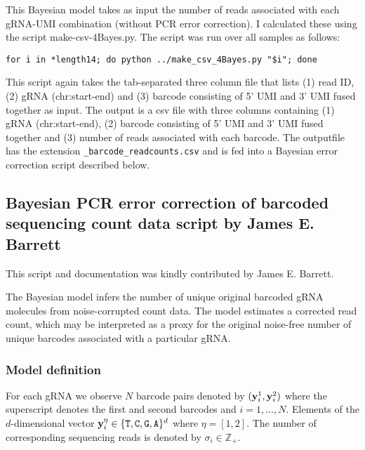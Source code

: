 This Bayesian model takes as input the number of reads associated with each gRNA-UMI combination (without PCR error correction). I calculated these using the script make-csv-4Bayes.py. The script was run over all samples as follows:

\begin{lstlisting}
for i in *length14; do python ../make_csv_4Bayes.py "$i"; done
\end{lstlisting}

This script again takes the tab-separated three column file that lists (1) read ID, (2) gRNA (chr:start-end) and (3) barcode consisting of 5' UMI and 3' UMI fused together as input. The output is a csv file with three columns containing (1) gRNA (chr:start-end), (2) barcode consisting of 5' UMI and 3' UMI fused together and (3) number of reads associated with each barcode. The outputfile has the extension \verb|_barcode_readcounts.csv| and is  fed into a Bayesian error correction script described below.

\subsection{Bayesian PCR error correction of barcoded sequencing count data script by James E. Barrett}

This script and documentation was kindly contributed by James E. Barrett. 

The Bayesian model infers the number of unique original barcoded gRNA molecules from noise-corrupted count data. The model estimates a corrected read count, which may be interpreted as a proxy for the original noise-free number of unique barcodes associated with a particular gRNA. 

\subsubsection{Model definition}
For each gRNA we observe $N$ barcode pairs denoted by $(\boldsymbol{\mathbf{y}}_{i}^1,\boldsymbol{\mathbf{y}}_{i}^2)$ where the superscript denotes the first and second barcodes and $i=1,\ldots,N$. Elements of the $d$-dimensional vector $\vecy_{i}^{\eta}\in\{\verb+T+,\verb+C+,\verb+G+,\verb+A+\}^d$ where $\eta=[1,2]$. The number of corresponding sequencing reads is denoted by $\sigma_{i}\in\mathbb{Z}_+$. 

